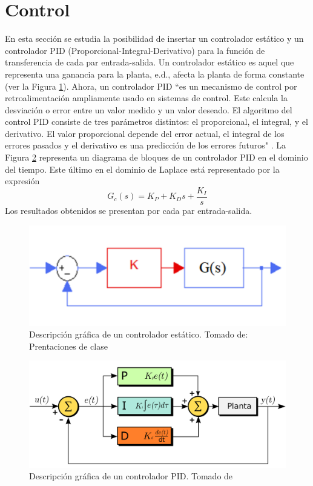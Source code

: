 \documentclass[journal]{IEEEtran}
\begin{document}
\section{Control}
En esta sección se estudia la posibilidad de insertar un controlador estático y un controlador PID (Proporcional-Integral-Derivativo) para la función de transferencia de cada par entrada-salida. Un controlador estático es aquel que representa una ganancia para la planta, e.d., afecta la planta de forma constante (ver la Figura \ref{fig:estatico}). Ahora, un controlador PID ``es un mecanismo de control por retroalimentación ampliamente usado en sistemas de control. Este calcula la desviación o error entre un valor medido y un valor deseado. El algoritmo del control PID consiste de tres parámetros distintos: el proporcional, el integral, y el derivativo. El valor proporcional depende del error actual, el integral de los errores pasados y el derivativo es una predicción de los errores futuros" \cite{wiki:PID}. La Figura \ref{fig:PID} representa un diagrama de bloques de un controlador PID en el dominio del tiempo. Este último en el dominio de Laplace está representado por la expresión
\begin{equation}
\label{eq:PID}
G_c(s) = K_P+K_Ds+\dfrac{K_I}{s}
\end{equation}
Los resultados obtenidos se presentan por cada par entrada-salida.\\

\begin{figure}[h!]
\caption{Descripción gráfica de un controlador estático. Tomado de: Prentaciones de clase\label{fig:estatico}}
  \centering
\includegraphics[scale=0.55]{control/Capture.PNG}
\end{figure}

\begin{figure}[h!]
\caption{Descripción gráfica de un controlador PID. Tomado de \cite{wiki:PID}\label{fig:PID}}
  \centering
\includegraphics[scale=0.12]{control/Controlador_pid_svg.png}
\end{figure}
\end{document}
